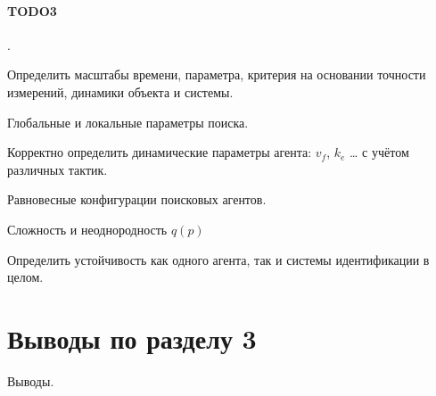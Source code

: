 \paragraph{TODO3}.

Определить масштабы времени, параметра, критерия на основании точности измерений,
динамики объекта и системы.

Глобальные и локальные параметры поиска.

Корректно определить динамические параметры агента: $v_f$, $k_e$ \ldots
с учётом различных тактик.

Равновесные конфигурации поисковых агентов.

Сложность и неоднородность $q(p)$

Определить устойчивость как одного агента, так и системы идентификации в целом.







\section{Выводы по разделу 3}  %

Выводы.


%
%
%
%
%



%
%
%
%
